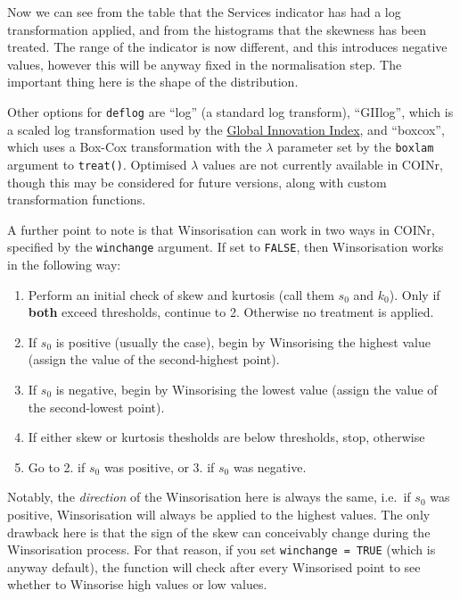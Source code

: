 \documentclass[
]{book}
\providecommand{\tightlist}{%
  \setlength{\itemsep}{0pt}\setlength{\parskip}{0pt}}
\begin{document}
Now we can see from the table that the Services indicator has had a log transformation applied, and from the histograms that the skewness has been treated. The range of the indicator is now different, and this introduces negative values, however this will be anyway fixed in the normalisation step. The important thing here is the shape of the distribution.

Other options for \texttt{deflog} are ``log'' (a standard log transform), ``GIIlog'', which is a scaled log transformation used by the \href{https://www.globalinnovationindex.org/}{Global Innovation Index}, and ``boxcox'', which uses a Box-Cox transformation with the \(\lambda\) parameter set by the \texttt{boxlam} argument to \texttt{treat()}. Optimised \(\lambda\) values are not currently available in COINr, though this may be considered for future versions, along with custom transformation functions.

A further point to note is that Winsorisation can work in two ways in COINr, specified by the \texttt{winchange} argument. If set to \texttt{FALSE}, then Winsorisation works in the following way:

\begin{enumerate}
\def\labelenumi{\arabic{enumi}.}
\tightlist
\item
  Perform an initial check of skew and kurtosis (call them \(s_0\) and \(k_0\)). Only if \textbf{both} exceed thresholds, continue to 2. Otherwise no treatment is applied.
\item
  If \(s_0\) is positive (usually the case), begin by Winsorising the highest value (assign the value of the second-highest point).
\item
  If \(s_0\) is negative, begin by Winsorising the lowest value (assign the value of the second-lowest point).
\item
  If either skew or kurtosis thesholds are below thresholds, stop, otherwise
\item
  Go to 2. if \(s_0\) was positive, or 3. if \(s_0\) was negative.
\end{enumerate}

Notably, the \emph{direction} of the Winsorisation here is always the same, i.e.~if \(s_0\) was positive, Winsorisation will always be applied to the highest values. The only drawback here is that the sign of the skew can conceivably change during the Winsorisation process. For that reason, if you set \texttt{winchange\ =\ TRUE} (which is anyway default), the function will check after every Winsorised point to see whether to Winsorise high values or low values.
\end{document}

